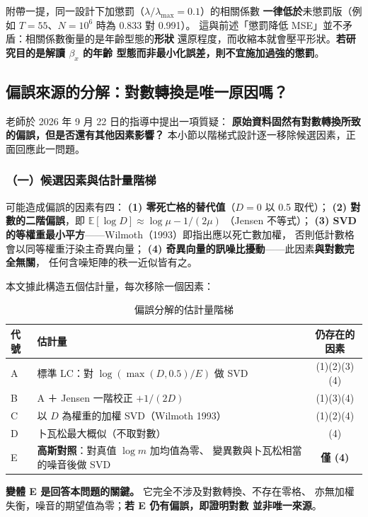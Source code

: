 \documentclass[UTF8, fontset=macnew, a4paper, 12pt]{ctexart}
\begin{document}
附帶一提，同一設計下加懲罰（$\lambda/\lambda_{\max}=0.1$）的相關係數
\textbf{一律低於}未懲罰版（例如 $T=55$、$N=10^6$ 時為 0.833 對 0.991）。
這與前述「懲罰降低 MSE」並不矛盾：相關係數衡量的是年齡型態的\textbf{形狀}
還原程度，而收縮本就會壓平形狀。\textbf{若研究目的是解讀 $\beta_x$ 的年齡
型態而非最小化誤差，則不宜施加過強的懲罰}。

\subsection{偏誤來源的分解：對數轉換是唯一原因嗎？}\label{sec:decomp}

老師於 2026 年 9 月 22 日的指導中提出一項質疑：
\textbf{原始資料固然有對數轉換所致的偏誤，但是否還有其他因素影響？}
本小節以階梯式設計逐一移除候選因素，正面回應此一問題。

\subsubsection{（一）候選因素與估計量階梯}

可能造成偏誤的因素有四：
\textbf{(1) 零死亡格的替代值}（$D=0$ 以 0.5 取代）；
\textbf{(2) 對數的二階偏誤}，即 $\mathbb{E}[\log D]\approx\log\mu-1/(2\mu)$
（Jensen 不等式）；
\textbf{(3) SVD 的等權重最小平方}——Wilmoth（1993）即指出應以死亡數加權，
否則低計數格會以同等權重汙染主奇異向量；
\textbf{(4) 奇異向量的訊噪比擾動}——此因素\textbf{與對數完全無關}，
任何含噪矩陣的秩一近似皆有之。

本文據此構造五個估計量，每次移除一個因素：

\begin{table}[H]
\centering
\caption{偏誤分解的估計量階梯}
\small
\begin{tabular}{llc}
\toprule
代號 & 估計量 & 仍存在的因素\\
\midrule
A & 標準 LC：對 $\log(\max(D,0.5)/E)$ 做 SVD & (1)(2)(3)(4)\\
B & A ＋ Jensen 一階校正 $+1/(2D)$ & (1)(3)(4)\\
C & 以 $D$ 為權重的加權 SVD（Wilmoth 1993） & (1)(2)(4)\\
D & 卜瓦松最大概似（不取對數） & (4)\\
E & \textbf{高斯對照}：對真值 $\log m$ 加均值為零、
    變異數與卜瓦松相當的噪音後做 SVD & \textbf{僅 (4)}\\
\bottomrule
\end{tabular}
\label{tab:ladder}
\end{table}

\textbf{變體 E 是回答本問題的關鍵。} 它完全不涉及對數轉換、不存在零格、
亦無加權失衡，噪音的期望值為零；\textbf{若 E 仍有偏誤，即證明對數
並非唯一來源}。
\end{document}
